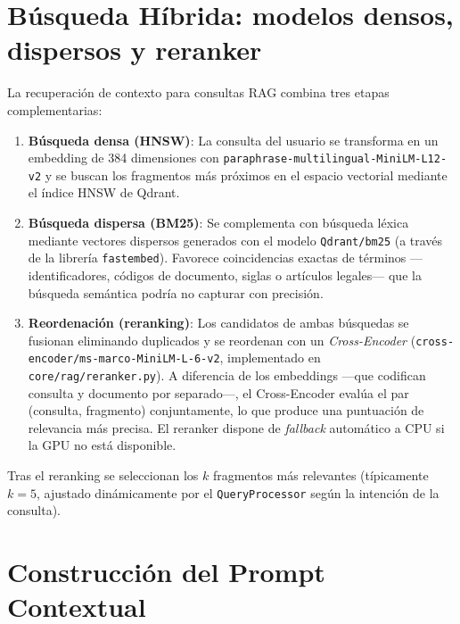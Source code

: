 \section{Búsqueda Híbrida: modelos densos, dispersos y reranker}
\label{anexo:busqueda-hibrida}

La recuperación de contexto para consultas RAG combina tres etapas complementarias:

\begin{enumerate}
    \item \textbf{Búsqueda densa (HNSW)}: La consulta del usuario se transforma en un embedding de 384 dimensiones con \texttt{paraphrase-multilingual-MiniLM-L12-v2} y se buscan los fragmentos más próximos en el espacio vectorial mediante el índice HNSW de Qdrant.

    \item \textbf{Búsqueda dispersa (BM25)}: Se complementa con búsqueda léxica mediante vectores dispersos generados con el modelo \texttt{Qdrant/bm25} (a través de la librería \texttt{fastembed}). Favorece coincidencias exactas de términos —identificadores, códigos de documento, siglas o artículos legales— que la búsqueda semántica podría no capturar con precisión.

    \item \textbf{Reordenación (reranking)}: Los candidatos de ambas búsquedas se fusionan eliminando duplicados y se reordenan con un \textit{Cross-Encoder} (\texttt{cross-encoder/ms-marco-MiniLM-L-6-v2}, implementado en \texttt{core/rag/reranker.py}). A diferencia de los embeddings —que codifican consulta y documento por separado—, el Cross-Encoder evalúa el par (consulta, fragmento) conjuntamente, lo que produce una puntuación de relevancia más precisa. El reranker dispone de \textit{fallback} automático a CPU si la GPU no está disponible.
\end{enumerate}

Tras el reranking se seleccionan los $k$ fragmentos más relevantes (típicamente $k=5$, ajustado dinámicamente por el \texttt{QueryProcessor} según la intención de la consulta).

\section{Construcción del Prompt Contextual}
\label{anexo:prompt}


